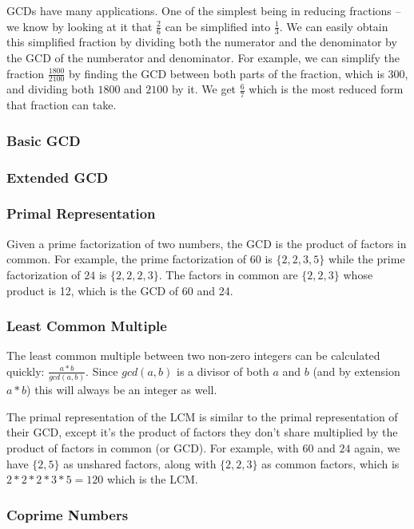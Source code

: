GCDs have many applications. One of the simplest being in reducing fractions -- we know by looking at it that $\frac{2}{6}$ can be simplified into $\frac{1}{3}$. We can easily obtain this simplified fraction by dividing both the numerator and the denominator by the GCD of the numberator and denominator. For example, we can simplify the fraction $\frac{1800}{2100}$ by finding the GCD between both parts of the fraction, which is 300, and dividing both $1800$ and $2100$ by it. We get $\frac{6}{7}$ which is the most reduced form that fraction can take.

\subsubsection{Basic GCD}

\subsubsection{Extended GCD}

\subsubsection{Primal Representation}

Given a prime factorization of two numbers, the GCD is the product of factors in common. For example, the prime factorization of $60$ is $\{2,2,3,5\}$ while the prime factorization of $24$ is $\{2,2,2,3\}$. The factors in common are $\{2,2,3\}$ whose product is 12, which is the GCD of 60 and 24.

\subsubsection{Least Common Multiple}

The least common multiple between two non-zero integers can be calculated quickly: $\frac{a * b}{gcd(a, b)}$. Since $gcd(a, b)$ is a divisor of both $a$ and $b$ (and by extension $a * b$) this will always be an integer as well.

The primal representation of the LCM is similar to the primal representation of their GCD, except it's the product of factors they don't share multiplied by the product of factors in common (or GCD). For example, with $60$ and $24$ again, we have $\{2,5\}$ as unshared factors, along with $\{2,2,3\}$ as common factors, which is $2 * 2 * 2 * 3 * 5 = 120$ which is the LCM.

\subsubsection{Coprime Numbers}

